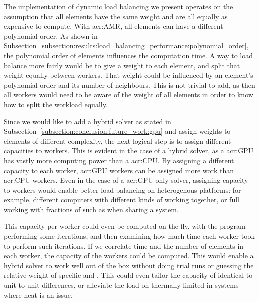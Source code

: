 The implementation of dynamic load balancing we present operates on the assumption that all elements
have the same weight and are all equally as expensive to compute. With \acrshort{acr:AMR}, all
elements can have a different polynomial order. As shown in
Subsection~\ref{subsection:results:load_balancing_performance:polynomial_order}, the polynomial
order of elements influences the computation time. A way to load balance more fairly would be to
give a weight to each element, and split that weight equally between workers. That weight could be
influenced by an element's polynomial order and its number of neighbours. This is not trivial to
add, as then all workers would need to be aware of the weight of all elements in order to know how
to split the workload equally.

Since we would like to add a hybrid solver as stated in
Subsection~\ref{subsection:conclusion:future_work:gpu} and assign weights to elements of different
complexity, the next logical step is to assign different capacities to workers. This is evident in
the case of a hybrid solver, as a \acrshort{acr:GPU} has vastly more computing power than a
\acrshort{acr:CPU}. By assigning a different capacity to each worker, \acrshort{acr:GPU} workers can
be assigned more work than \acrshort{acr:CPU} workers. Even in the case of a \acrshort{acr:GPU} only
solver, assigning capacity to workers would enable better load balancing on heterogenous platforms:
for example, different computers with different kinds of  working together, or
full  working with fractions of  such as when sharing a
system. 

This capacity per worker could even be computed on the fly, with the program performing some
iterations, and then examining how much time each worker took to perform such iterations. If we
correlate time and the number of elements in each worker, the capacity of the workers could
be computed. This would enable a hybrid solver to work well out of the box without doing trial runs
or guessing the relative weight of specific  and . This
could even tailor the capacity of identical  to unit-to-unit differences, or
alleviate the load on thermally limited  in systems where heat is an issue.

